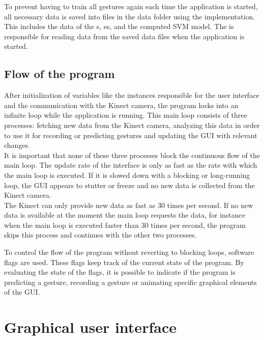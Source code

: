 To prevent having to train all gestures again each time the application is started, all necessary data is saved into files in the data folder using the  implementation. This includes the data of the s, es,  and the computed SVM model. The  is responsible for reading data from the saved data files when the application is started.\\


\subsection{Flow of the program}

After initialization of variables like the instances responsible for the user interface and the communication with the Kinect camera, the program locks into an infinite loop while the application is running. This main loop consists of three processes: fetching new data from the Kinect camera, analyzing this data in order to use it for recording or predicting gestures and updating the GUI with relevant changes.\\

It is important that none of these three processes block the continuous flow of the main loop. The update rate of the interface is only as fast as the rate with which the main loop is executed. If it is slowed down with a blocking or long-running loop, the GUI appears to stutter or freeze and no new data is collected from the Kinect camera.\\

The Kinect can only provide new data as fast as 30 times per second. If no new data is available at the moment the main loop requests the data, for instance when the main loop is executed faster than 30 times per second, the program skips this process and continues with the other two processes.\\

\newpage

To control the flow of the program without reverting to blocking loops, software flags are used. These flags keep track of the current state of the program. By evaluating the state of the flags, it is possible to indicate if the program is predicting a gesture, recording a gesture or animating specific graphical elements of the GUI.


\section{Graphical user interface}

